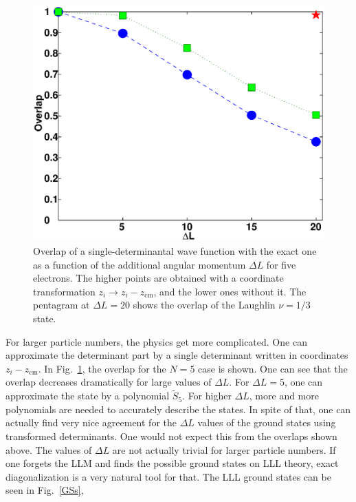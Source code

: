 \documentclass{article}
\begin{document}
%
\begin{figure}[hbt]
\begin{center}
\includegraphics[width=0.79\columnwidth]{Overlaps_N5}
\end{center}
\caption{Overlap of a single-determinantal wave function with the
exact one as a function of the additional angular momentum $\Delta L$
for five electrons.  The higher points are obtained with a coordinate
transformation $z_i \to z_i- z_{\mathrm{cm}}$, and the lower ones
without it. The pentagram at $\Delta L = 20 $ shows the overlap of the
Laughlin $\nu=1/3$ state.}
\label{overlaps}
\end{figure}
%
For larger particle numbers, the physics get more complicated. One can
approximate the determinant part by a single determinant written in
coordinates $z_i- z_{\mathrm{cm}}$. In Fig.~\ref{overlaps}, the
overlap for the $N=5$ case is shown. One can see that the overlap
decreases dramatically for large values of $\Delta L$.  For $\Delta L
= 5$, one can approximate the state by a polynomial $\tilde S_5$. For
higher $\Delta L$, more and more polynomials are needed to accurately
describe the states.  In spite of that, one can actually find very
nice agreement for the $\Delta L$ values of the ground states using
transformed determinants\cite{beyondMDD}. One would not expect this
from the overlaps shown above.  The values of $\Delta L$ are not
actually trivial for larger particle numbers. If one forgets the LLM
and finds the possible ground states on LLL theory, exact
diagonalization is a very natural tool for that\cite{vortex}. The LLL
ground states can be seen in Fig.~\ref{GSs},
%
\end{document}
